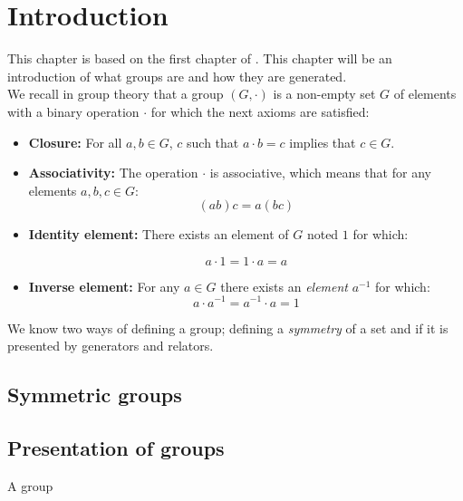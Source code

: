 \chapter{Introduction}

This chapter is based on the first chapter of \cite{magnusCombinatorialGroupTheory2004}. This chapter will be an introduction of what groups are and how they are generated.\\

We recall in group theory that a group $(G,\cdot)$ is a non-empty set $G$ of elements with a binary operation $\cdot$ for which the next axioms are satisfied:

\begin{itemize}
  \item \textbf{Closure:} For all $a,b \in G$, $c$ such that $a\cdot b = c$ implies that $c \in G$.

  \item \textbf{Associativity:} The operation $\cdot$ is associative, which means that for any elements $a,b,c \in G$:
    $$(ab)c = a(bc)$$

  \item \textbf{Identity element:} There exists an element of $G$ noted $1$ for which:

  $$a\cdot 1 = 1\cdot a = a$$

  \item \textbf{Inverse element:} For any $a \in G$ there exists an \textit{element} $a^{-1}$ for which:
  $$ a\cdot a^{-1} = a^{-1} \cdot a = 1 $$
\end{itemize}

We know two ways of defining a group; defining a \textit{symmetry} of a set and if it is presented by generators and relators.

\section{Symmetric groups}



\section{Presentation of groups}

A group
